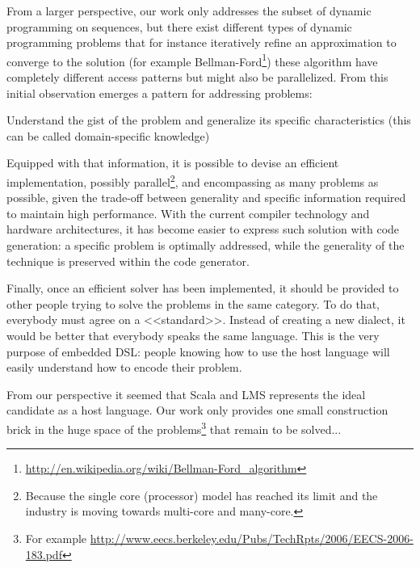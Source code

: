 From a larger perspective, our work only addresses the subset of dynamic programming on sequences, but there exist different types of dynamic programming problems that for instance iteratively refine an approximation to converge to the solution (for example Bellman-Ford\footnote{\url{http://en.wikipedia.org/wiki/Bellman-Ford_algorithm}}) these algorithm have completely different access patterns but might also be parallelized. From this initial observation emerges a pattern for addressing problems:\ol
\item Understand the gist of the problem and generalize its specific characteristics (this can be called domain-specific knowledge)
\item Equipped with that information, it is possible to devise an efficient implementation, possibly parallel\footnote{Because the single core (processor) model has reached its limit and the industry is moving towards multi-core and many-core.}, and encompassing as many problems as possible, given the trade-off between generality and specific information required to maintain high performance. With the current compiler technology and hardware architectures, it has become easier to express such solution with code generation: a specific problem is optimally addressed, while the generality of the technique is preserved within the code generator.
\item Finally, once an efficient solver has been implemented, it should be provided to other people trying to solve the problems in the same category. To do that, everybody must agree on a <<standard>>. Instead of creating a new dialect, it would be better that everybody speaks the same language. This is the very purpose of embedded DSL: people knowing how to use the host language will easily understand how to encode their problem.
\ole

From our perspective it seemed that Scala and LMS represents the ideal candidate as a host language. Our work only provides one small construction brick in the huge space of the problems\footnote{For example \url{http://www.eecs.berkeley.edu/Pubs/TechRpts/2006/EECS-2006-183.pdf}} that remain to be solved...

%
